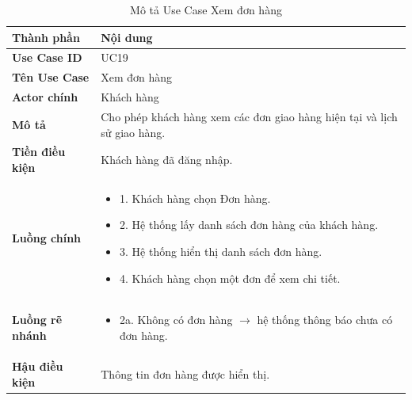\begin{longtable}{|L{3cm}|L{11cm}|}
\caption{Mô tả Use Case Xem đơn hàng}
\label{tab:mo-ta-uc19-xem-don}
\\
\hline
\textbf{Thành phần} & \textbf{Nội dung} \\
\hline
\textbf{Use Case ID} & UC19 \\
\hline
\textbf{Tên Use Case} & Xem đơn hàng \\
\hline
\textbf{Actor chính} & Khách hàng \\
\hline
\textbf{Mô tả} & Cho phép khách hàng xem các đơn giao hàng hiện tại và lịch sử giao hàng. \\
\hline
\textbf{Tiền điều kiện} & Khách hàng đã đăng nhập. \\
\hline
\textbf{Luồng chính} & \begin{itemize}[leftmargin=*,topsep=2pt,itemsep=2pt]
\item 1. Khách hàng chọn Đơn hàng.
\item 2. Hệ thống lấy danh sách đơn hàng của khách hàng.
\item 3. Hệ thống hiển thị danh sách đơn hàng.
\item 4. Khách hàng chọn một đơn để xem chi tiết.
\end{itemize} \\
\hline
\textbf{Luồng rẽ nhánh} & \begin{itemize}[leftmargin=*,topsep=2pt,itemsep=2pt]
\item 2a. Không có đơn hàng $\rightarrow$ hệ thống thông báo chưa có đơn hàng.
\end{itemize} \\
\hline
\textbf{Hậu điều kiện} & Thông tin đơn hàng được hiển thị. \\
\hline
\end{longtable}

